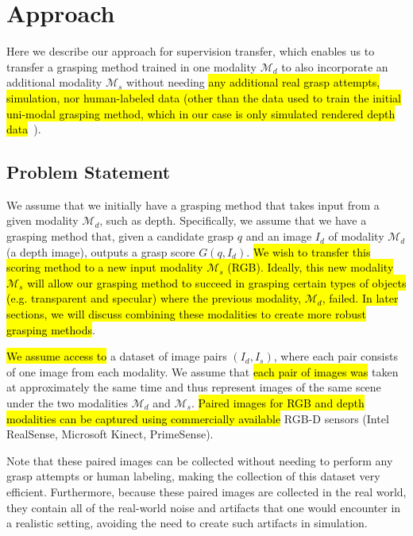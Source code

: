 \section{Approach}
\label{sec:method}
Here we describe our approach for supervision transfer, which enables us to transfer a grasping method trained in one modality $\mathcal{M}_d$ to also incorporate an additional modality $\mathcal{M}_s$ without needing \hl{any additional real grasp attempts, simulation, nor human-labeled data (other than the data used to train the initial uni-modal grasping method, which in our case is only simulated rendered depth data}~\cite{satish2019policy}).

\subsection{Problem Statement}
We assume that we initially have a grasping method that takes input from a given modality $\mathcal{M}_d$, such as depth.  
Specifically, we assume that we have a grasping method that, given a candidate grasp $q$ and an image $I_d$ of modality $\mathcal{M}_d$ (\eg a depth image), outputs a grasp score $G(q, I_d)$. \hl{We wish to transfer this scoring method to a new input modality $\mathcal{M}_s$ (\eg RGB). Ideally, this new modality $\mathcal{M}_s$ will allow our grasping method to succeed in grasping certain types of objects (e.g. transparent and specular) where the previous modality, $\mathcal{M}_d$, failed. In later sections, we will discuss combining these modalities to create more robust grasping methods}.

\hl{We assume access to} a dataset of image pairs $(I_d, I_s)$, where each pair consists of one image from each modality.  We assume that \hl{each pair of images was} taken at approximately the same time and thus represent images of the same scene under the two modalities $\mathcal{M}_d$ and $\mathcal{M}_s$. \hl{Paired images for RGB and depth modalities can be captured using commercially available} RGB-D sensors (\eg Intel RealSense, Microsoft Kinect, PrimeSense).

Note that these paired images can be collected without needing to perform any grasp attempts or human labeling, making the collection of this dataset very efficient.  Furthermore, because these paired images are collected in the real world, they contain all of the real-world noise and artifacts that one would encounter in a realistic setting, avoiding the need to create such artifacts in simulation. 

